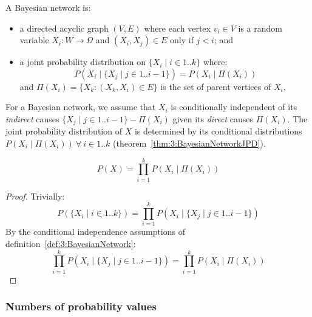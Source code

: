 \begin{dfn}
  \label{def:3:BayesianNetwork}
  A Bayesian network is:
  \begin{itemize}
    \item a directed acyclic graph $(V, E)$ where each vertex $v_i \in V$ is a
          random variable $X_i : W \to \Omega$ and $(X_i, X_j) \in E$
          only if $j < i$; and
    \item a joint probability distribution on $\{ X_i \mid i \in 1 .. k \}$
          where:
          \begin{equation}
            P(X_i \mid \{ X_j \mid j \in 1 .. i - 1 \}) = P(X_i \mid \Pi(X_i))
          \end{equation}
          and $\Pi(X_i) = \{ X_k : (X_k, X_i) \in E \}$ is the set of
          parent vertices of $X_i$.
  \end{itemize}
\end{dfn}

For a Bayesian network, we assume that $X_i$ is conditionally independent of
its \textit{indirect} causes $\{ X_j \mid j \in 1 .. i - 1 \} - \Pi(X_i)$ given
its \textit{direct} causes $\Pi(X_i)$.
The joint probability distribution of $X$ is determined by its conditional
distributions $P(X_i \mid \Pi(X_i)) \ \forall\ i \in 1 .. k$
(theorem~\ref{thm:3:BayesianNetworkJPD}).

\begin{thm}
  \label{thm:3:BayesianNetworkJPD}
  \begin{equation}
    P(X) = \prod_{i = 1}^{k} P(X_i \mid \Pi(X_i))
  \end{equation}
  \begin{proof}
    Trivially:
    \begin{equation}
      P(\{ X_i \mid i \in 1 .. k \})
      = \prod_{i = 1}^{k} P(X_i \mid \{ X_j \mid j \in 1 .. i - 1 \})
    \end{equation}
    By the conditional independence assumptions of
    definition~\ref{def:3:BayesianNetwork}:
    \begin{equation}
      \prod_{i = 1}^{k} P(X_i \mid \{ X_j \mid j \in 1 .. i - 1 \})
      = \prod_{i = 1}^{k} P(X_i \mid \Pi(X_i))
    \end{equation}
  \end{proof}
\end{thm}

\subsubsection{Numbers of probability values}

